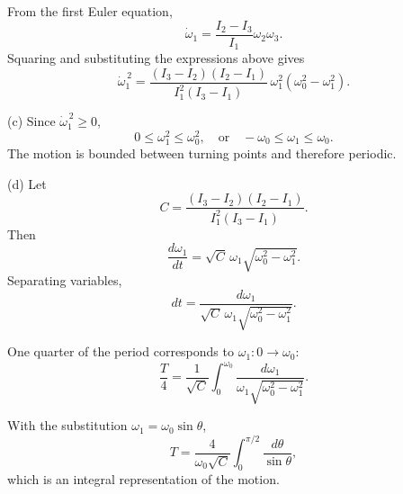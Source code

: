 \documentclass[../main.tex]{subfiles}
\begin{document}
From the first Euler equation,
\[
\dot{\omega}_1=\frac{I_2-I_3}{I_1}\omega_2\omega_3.
\]
Squaring and substituting the expressions above gives
\[
\boxed{
\dot{\omega}_1^{\,2}
=
\frac{(I_3-I_2)(I_2-I_1)}{I_1^2(I_3-I_1)}
\,\omega_1^2(\omega_0^2-\omega_1^2)
}.
\]



(c) Since \(\dot{\omega}_1^{\,2}\ge0\),
\[
0\le \omega_1^2\le \omega_0^2,
\quad\text{or}\quad
-\omega_0\le\omega_1\le\omega_0.
\]
The motion is bounded between turning points and therefore periodic.


(d) Let
\[
C=\frac{(I_3-I_2)(I_2-I_1)}{I_1^2(I_3-I_1)}.
\]
Then
\[
\frac{d\omega_1}{dt}
=
\sqrt{C}\,\omega_1\sqrt{\omega_0^2-\omega_1^2}.
\]
Separating variables,
\[
dt
=
\frac{d\omega_1}{\sqrt{C}\,\omega_1\sqrt{\omega_0^2-\omega_1^2}}.
\]

One quarter of the period corresponds to \(\omega_1:0\to\omega_0\):
\[
\frac{T}{4}
=
\frac{1}{\sqrt{C}}
\int_0^{\omega_0}
\frac{d\omega_1}{\omega_1\sqrt{\omega_0^2-\omega_1^2}}.
\]

With the substitution \(\omega_1=\omega_0\sin\theta\),
\[
\boxed{
T
=
\frac{4}{\omega_0\sqrt{C}}
\int_0^{\pi/2}\frac{d\theta}{\sin\theta}
},
\]
which is an integral representation of the motion.
\end{document}
